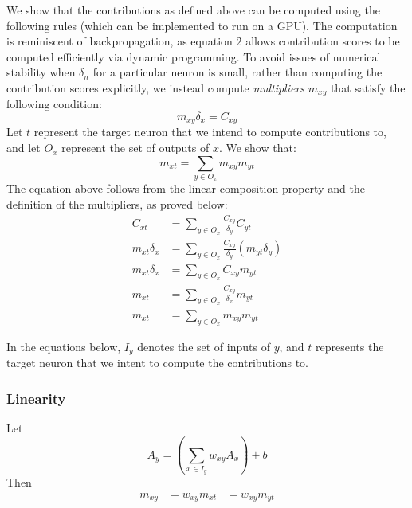 \documentclass{article}
\begin{document}
We show that the contributions as defined above can be computed using the following rules (which can be implemented to run on a GPU). The computation is reminiscent of backpropagation, as equation $2$ allows contribution scores to be computed efficiently via dynamic programming. To avoid issues of numerical stability when $\delta_n$ for a particular neuron is small, rather than computing the contribution scores explicitly, we instead compute \emph{multipliers} $m_{xy}$ that satisfy the following condition:
\begin{equation}
m_{xy} \delta_x = C_{xy}
\end{equation} 
Let $t$ represent the target neuron that we intend to compute contributions to, and let $O_x$ represent the set of outputs of $x$. We show that:
\begin{equation}
m_{xt} = \sum_{y \in O_x} m_{xy}m_{yt}
\end{equation} 
The equation above follows from the linear composition property and the definition of the multipliers, as proved below:
\begin{equation}
\begin{aligned}
C_{xt} &= \sum_{y \in O_x} \frac{C_{xy}}{\delta_y}C_{yt}\\
m_{xt} \delta_x &= \sum_{y \in O_x} \frac{C_{xy}}{\delta_y}(m_{yt} \delta_y)\\
m_{xt} \delta_x &= \sum_{y \in O_x} C_{xy}m_{yt}\\
m_{xt} &= \sum_{y \in O_x} \frac{C_{xy}}{\delta_x}m_{yt}\\
m_{xt} &= \sum_{y \in O_x} m_{xy} m_{yt}
\end{aligned}
\end{equation} 

In the equations below, $I_y$ denotes the set of inputs of $y$, and $t$ represents the target neuron that we intent to compute the contributions to.

\subsubsection{Linearity}
Let
\begin{equation}
A_y = \left(\sum_{x \in I_y} w_{xy} A_x\right) + b  
\end{equation}
Then
\begin{equation}
\begin{aligned}
m_{xy} &= w_{xy}
m_{xt} &= w_{xy} m_{yt}
\end{aligned}
\end{equation}
\end{document}
